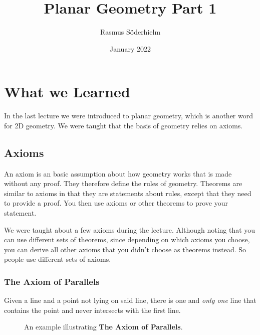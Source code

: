\documentclass{article}
\title{Planar Geometry Part 1}
\author{Rasmus Söderhielm}
\date{January 2022}
\theoremstyle{maintheorem}
\begin{document}
\linespread{1.5}\selectfont

\maketitle

\tableofcontents

\section*{\color{MainColor}What we Learned} \label{Learned}
In the last lecture we were introduced to planar geometry, which is another word for 2D geometry.
We were taught that the basis of geometry relies on axioms.

\subsection{Axioms}
An axiom is an basic assumption about how geometry works that is made without any proof. They therefore define the rules of geometry.
Theorems are similar to axioms in that they are statements about rules, except that they need to provide a proof.
You then use axioms or other theorems to prove your statement.

We were taught about a few axioms during the lecture.
Although noting that you can use different sets of theorems, since depending on which axioms you choose, you can derive all other axioms that you didn't choose as theorems instead.
So people use different sets of axioms.

\subsubsection{The Axiom of Parallels}\label{ParallelSect}
Given a line and a point not lying on said line, there is one and \emph{only one} line that contains the point and never intersects with the first line.



\begin{figure}[h]\label{ParallelFig}
    \centering

    \caption{An example illustrating \textbf{The Axiom of Parallels}.}
\end{figure}
\end{document}

